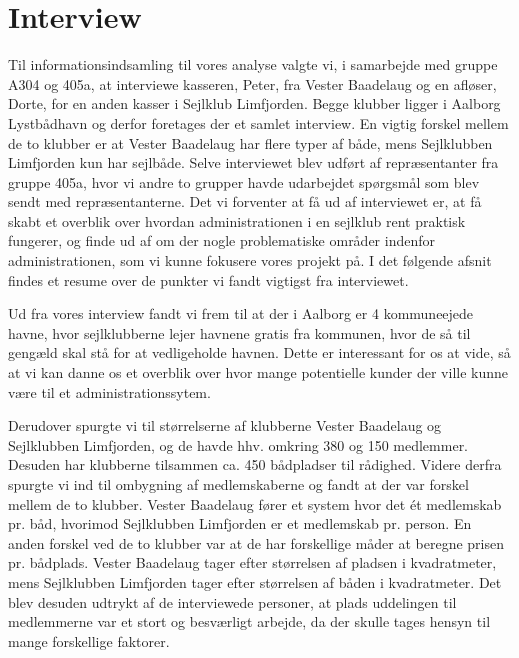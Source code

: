 \chapter{Interview}
\label{chap:Interview}
Til informationsindsamling til vores analyse valgte vi, i samarbejde med gruppe A304 og 405a, at interviewe kasseren, Peter, fra Vester Baadelaug og en afløser, Dorte, for en anden kasser i Sejlklub Limfjorden. Begge klubber ligger i Aalborg Lystbådhavn og derfor foretages der et samlet interview. En vigtig forskel mellem de to klubber er at Vester Baadelaug har flere typer af både, mens Sejlklubben Limfjorden kun har sejlbåde. Selve interviewet blev udført af repræsentanter fra gruppe 405a, hvor vi andre to grupper havde udarbejdet spørgsmål som blev sendt med repræsentanterne. Det vi forventer at få ud af interviewet er, at få skabt et overblik over hvordan administrationen i en sejlklub rent praktisk fungerer, og finde ud af om der nogle problematiske områder indenfor administrationen, som vi kunne fokusere vores projekt på. I det følgende afsnit findes et resume over de punkter vi fandt vigtigst fra interviewet.

Ud fra vores interview fandt vi frem til at der i Aalborg er 4 kommuneejede havne, hvor sejlklubberne lejer havnene gratis fra kommunen, hvor de så til gengæld skal stå for at vedligeholde havnen. Dette er interessant for os at vide, så at vi kan danne os et overblik over hvor mange potentielle kunder der ville kunne være til et administrationssytem. 

Derudover spurgte vi til størrelserne af klubberne Vester Baadelaug og Sejlklubben Limfjorden, og de havde hhv. omkring 380 og 150 medlemmer. Desuden har klubberne tilsammen ca. 450 bådpladser til rådighed. Videre derfra spurgte vi ind til ombygning af medlemskaberne og fandt at der var forskel mellem de to klubber. Vester Baadelaug fører et system hvor det ét medlemskab pr. båd, hvorimod Sejlklubben Limfjorden er et medlemskab pr. person. En anden forskel ved de to klubber var at de har forskellige måder at beregne prisen pr. bådplads. Vester Baadelaug tager efter størrelsen af pladsen i kvadratmeter, mens Sejlklubben Limfjorden tager efter størrelsen af båden i kvadratmeter. Det blev desuden udtrykt af de interviewede personer, at plads uddelingen til medlemmerne var et stort og besværligt arbejde, da der skulle tages hensyn til mange forskellige faktorer.

